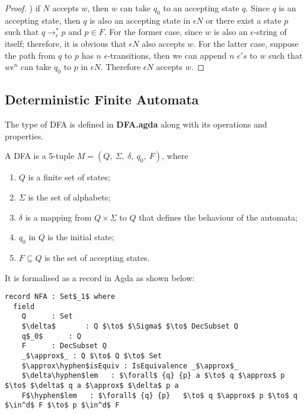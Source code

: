 \begin{proof}
\par {}) if \(N\) accepts \(w\), then \(w\) can take \(q_0\) to an
accepting state \(q\). Since \(q\) is an accepting state, then \(q\)
is also an accepting state in \(\epsilon N\) or there exist a state
\(p\) such that \(q \to_\epsilon^* p\) and \(p \in F\). For the former
case, since \(w\) is also an \(\epsilon\)-string of itself; therefore,
it is obvious that \(\epsilon N\) also accepts \(w\). For the latter
case, suppose the path from \(q\) to \(p\) has \(n\)
\(\epsilon\)-transitions, then we can append \(n\) \(\epsilon's\) to
\(w\) such that \(w\epsilon^n\) can take \(q_0\) to \(p\) in
\(\epsilon N\). Therefore \(\epsilon N\) accepts \(w\). 
\end{proof}

\subsection{Deterministic Finite Automata}
\par The type of DFA is defined in \textbf{DFA.agda} along with its
operations and properties. 

\begin{defn}
\noindent A DFA is a 5-tuple \(M = (Q
,\ \Sigma,\ \delta,\ q_0,\ F)\), where
\begin{enumerate}[nolistsep]
  \item \(Q\) is a finite set of states;
  \item \(\Sigma\) is the set of alphabets;
  \item \(\delta\) is a mapping from \(Q \times \Sigma\) to \(Q\) that defines the behaviour of the automata;
  \item \(q_0\) in \(Q\) is the initial state;
  \item \(F \subseteq Q\) is the set of accepting states. 
\end{enumerate}
\end{defn}

\par It is formalised as a record in Agda as shown below: 

\begin{lstlisting}[mathescape=true,xleftmargin=.3\textwidth]
record NFA : Set$_1$ where
  field
    Q      : Set
    $\delta$       : Q $\to$ $\Sigma$ $\to$ DecSubset Q
    q$_0$      : Q
    F      : DecSubset Q
    _$\approx$_ : Q $\to$ Q $\to$ Set
    $\approx\hyphen$isEquiv : IsEquivalence _$\approx$_
    $\delta\hyphen$lem   : $\forall$ {q} {p} a $\to$ q $\approx$ p $\to$ $\delta$ q a $\approx$ $\delta$ p a
    F$\hyphen$lem   : $\forall$ {q} {p}   $\to$ q $\approx$ p $\to$ q $\in^d$ F $\to$ p $\in^d$ F
\end{lstlisting}

